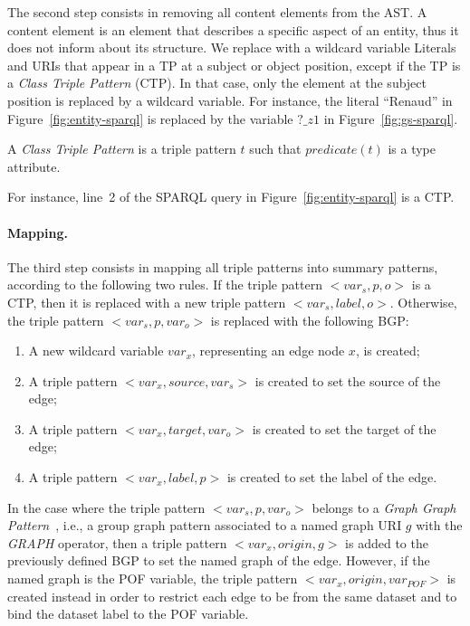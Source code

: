 The second step consists in removing all content elements from the AST. A content element is an element that describes a specific aspect of an entity, thus it does not inform about its structure. We replace with a wildcard variable Literals and URIs that appear in a TP at a subject or object position, except if the TP is a \emph{Class Triple Pattern} (CTP). In that case, only the element at the subject position is replaced by a wildcard variable. For instance, the literal ``Renaud'' in Figure~\ref{fig:entity-sparql} is replaced by the variable $?\_z1$ in Figure~\ref{fig:gs-sparql}.

\begin{definition}
	A \emph{Class Triple Pattern} is a triple pattern $t$ such that $predicate(t)$ is a type attribute.
	\label{def:class-triple-pattern}
\end{definition}

For instance, line~2 of the SPARQL query in Figure~\ref{fig:entity-sparql} is a CTP.

\paragraph{Mapping.}

The third step consists in mapping all triple patterns into summary patterns, according to the following two rules. If the triple pattern $<var_s, p, o>$ is a CTP, then it is replaced with a new triple pattern \mbox{$<var_s, label, o>$}. Otherwise, the triple pattern \mbox{$<var_s, p, var_o>$} is replaced with the following BGP:

\begin{enumerate}
	\item A new wildcard variable $var_x$, representing an edge node $x$, is created;
	\item A triple pattern $<var_x, source, var_s>$ is created to set the source of the edge;
	\item A triple pattern $<var_x, target, var_o>$ is created to set the target of the edge;
	\item A triple pattern $<var_x, label, p>$ is created to set the label of the edge.
\end{enumerate}

In the case where the triple pattern $<var_s, p, var_o>$ belongs to a \emph{Graph Graph Pattern}~\cite{PrudS08}, i.e., a group graph pattern associated to a named graph URI $g$ with the \emph{GRAPH} operator, then a triple pattern $<var_x, origin, g>$ is added to the previously defined BGP to set the named graph of the edge. However, if the named graph is the POF variable, the triple pattern $<var_x, origin, var_{POF}>$ is created instead in order to restrict each edge to be from the same dataset and to bind the dataset label to the POF variable.


